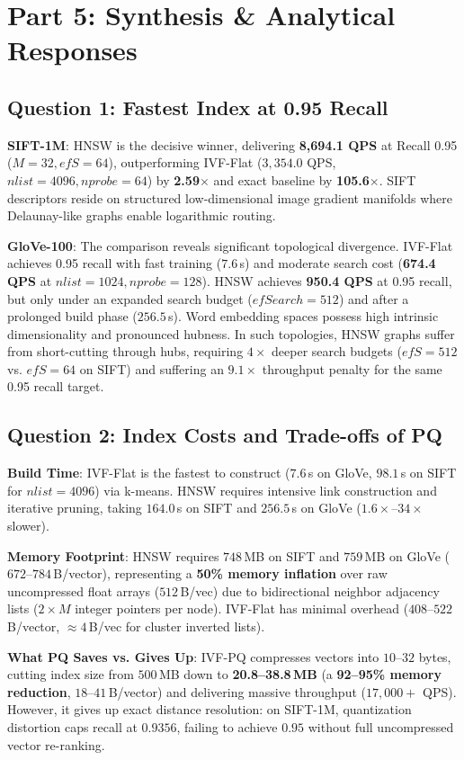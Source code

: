 \documentclass[10pt,twocolumn,a4paper]{article}
\begin{document}
\section{Part 5: Synthesis \& Analytical Responses}

\subsection{Question 1: Fastest Index at 0.95 Recall}
\textbf{SIFT-1M}: HNSW is the decisive winner, delivering \textbf{8,694.1 QPS} at Recall 0.95 ($M=32, efS=64$), outperforming IVF-Flat ($3,354.0$ QPS, $nlist=4096, nprobe=64$) by \textbf{2.59$\times$} and exact baseline by \textbf{105.6$\times$}. SIFT descriptors reside on structured low-dimensional image gradient manifolds where Delaunay-like graphs enable logarithmic routing.

\textbf{GloVe-100}: The comparison reveals significant topological divergence. IVF-Flat achieves 0.95 recall with fast training ($7.6$\,s) and moderate search cost (\textbf{674.4 QPS} at $nlist=1024, nprobe=128$). HNSW achieves \textbf{950.4 QPS} at 0.95 recall, but only under an expanded search budget ($efSearch=512$) and after a prolonged build phase ($256.5$\,s). Word embedding spaces possess high intrinsic dimensionality and pronounced hubness. In such topologies, HNSW graphs suffer from short-cutting through hubs, requiring $4\times$ deeper search budgets ($efS=512$ vs. $efS=64$ on SIFT) and suffering an $9.1\times$ throughput penalty for the same 0.95 recall target.

\subsection{Question 2: Index Costs and Trade-offs of PQ}
\textbf{Build Time}: IVF-Flat is the fastest to construct ($7.6$\,s on GloVe, $98.1$\,s on SIFT for $nlist=4096$) via k-means. HNSW requires intensive link construction and iterative pruning, taking $164.0$\,s on SIFT and $256.5$\,s on GloVe ($1.6\times$--$34\times$ slower).

\textbf{Memory Footprint}: HNSW requires $748$\,MB on SIFT and $759$\,MB on GloVe ($672$--$784$\,B/vector), representing a \textbf{50\% memory inflation} over raw uncompressed float arrays ($512$\,B/vec) due to bidirectional neighbor adjacency lists ($2 \times M$ integer pointers per node). IVF-Flat has minimal overhead ($408$--$522$\,B/vector, $\approx 4$\,B/vec for cluster inverted lists).

\textbf{What PQ Saves vs. Gives Up}: IVF-PQ compresses vectors into $10$--$32$ bytes, cutting index size from $500$\,MB down to \textbf{20.8--38.8\,MB} (a \textbf{92--95\% memory reduction}, $18$--$41$\,B/vector) and delivering massive throughput ($17,000+$ QPS). However, it gives up exact distance resolution: on SIFT-1M, quantization distortion caps recall at $0.9356$, failing to achieve $0.95$ without full uncompressed vector re-ranking.
\end{document}
